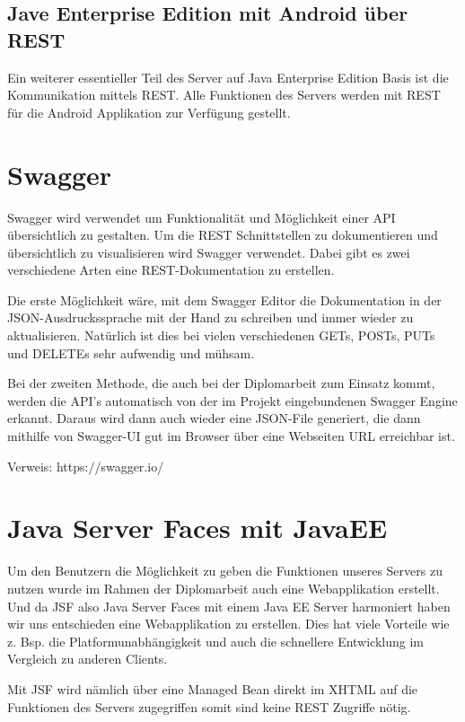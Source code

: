\subsection{Jave Enterprise Edition mit Android über REST}\label{sec:javaeeandroidrest}
Ein weiterer essentieller Teil des Server auf Java Enterprise Edition Basis ist die Kommunikation mittels REST. Alle Funktionen des Servers werden mit REST für die Android Applikation zur Verfügung gestellt. 

\section{Swagger}\label{sec:javaeeandroidrestswagger}
Swagger wird verwendet um Funktionalität und Möglichkeit einer API übersichtlich zu gestalten. Um die REST Schnittstellen zu dokumentieren und übersichtlich zu visualisieren wird Swagger verwendet. Dabei gibt es zwei verschiedene Arten eine REST-Dokumentation zu erstellen. 

Die erste Möglichkeit wäre, mit dem Swagger Editor die Dokumentation in der JSON-Ausdruckssprache mit der Hand zu schreiben und immer wieder zu aktualisieren. Natürlich ist dies bei vielen verschiedenen GETs, POSTs, PUTs und DELETEs sehr aufwendig und mühsam.

Bei der zweiten Methode, die auch bei der Diplomarbeit zum Einsatz kommt, werden die API's automatisch von der im Projekt eingebundenen Swagger Engine erkannt. Daraus wird dann auch wieder eine JSON-File generiert, die dann mithilfe von Swagger-UI gut im Browser über eine Webseiten URL erreichbar ist.


Verweis: https://swagger.io/

\section{Java Server Faces mit JavaEE}\label{sec:javaeejsf}
Um den Benutzern die Möglichkeit zu geben die Funktionen unseres Servers zu nutzen wurde im Rahmen der Diplomarbeit auch eine Webapplikation erstellt. Und da JSF also Java Server Faces mit einem Java EE Server harmoniert haben wir  uns entschieden eine Webapplikation zu erstellen. Dies hat viele Vorteile wie z. Bsp. die Platformunabhängigkeit und auch die schnellere Entwicklung im Vergleich zu anderen Clients. 

Mit JSF wird nämlich über eine Managed Bean direkt im XHTML auf die Funktionen des Servers zugegriffen somit sind keine REST Zugriffe nötig. 


